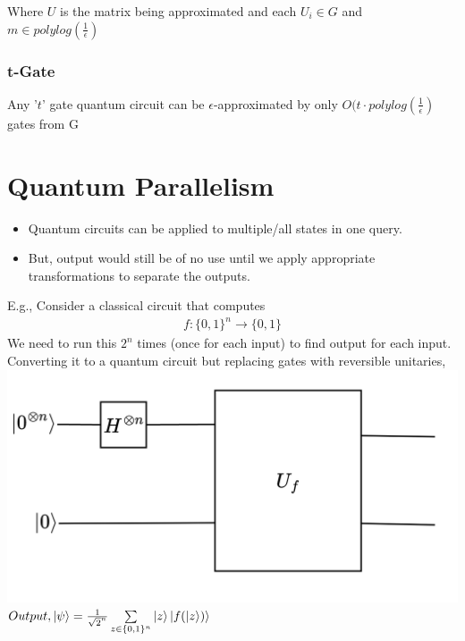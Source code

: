 \documentclass{article}
\begin{document}
Where $U$ is the matrix being approximated and each $U_{i} \in G$ and $m \in {polylog(\frac{1}{\epsilon})}$

\subsubsection{t-Gate}
Any '$t$' gate quantum circuit can be $\epsilon$-approximated by only $O(t \cdot polylog(\frac{1}{\epsilon})$ gates from G

\section{Quantum Parallelism}
\begin{itemize}
    \item Quantum circuits can be applied to multiple/all states in one query.
    \item But, output would still be of no use until we apply appropriate transformations to separate the outputs.
\end{itemize} 

E.g., Consider a classical circuit that computes 
\begin{align*}
    f: \{0, 1\}^{n} \rightarrow \{0, 1\}
\end{align*}
We need to run this $2^{n}$ times (once for each input) to find output for each input.
\medskip
Converting it to a quantum circuit but replacing gates with reversible unitaries,
\includegraphics[scale=0.5]{q5.png}
$Output, \ket{\psi} = \frac{1}{\sqrt{2}^{n}} \sum \limits _{z \in \{0, 1\}^{n}} \ket{z} \ket{f(\ket{z})} $
\end{document}
